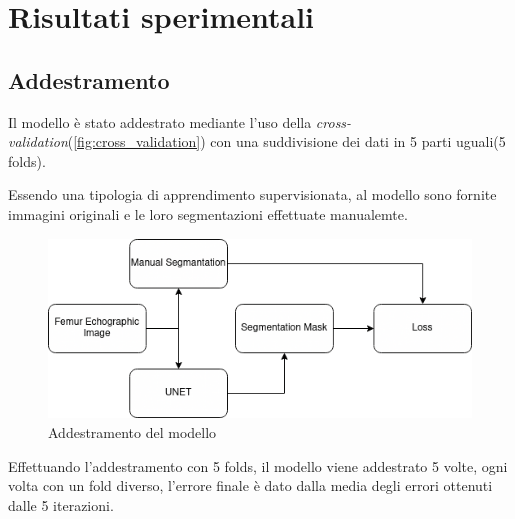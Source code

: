 \chapter{Risultati sperimentali} %
\label{chap:Risultati sperimentali}

\section{Addestramento} %
\label{sec:Addestramento}

Il modello \`e stato addestrato mediante l'uso della \textit{cross-validation}(\autoref{fig:cross_validation})
con una suddivisione dei dati in 5 parti uguali(5 folds).

Essendo una tipologia di apprendimento supervisionata, al modello sono fornite immagini
originali e le loro segmentazioni effettuate manualemte.

\begin{figure}[!ht]
	\begin{adjustbox}{width=0.7\columnwidth, center}
    \includegraphics{./images/training.png}
  \end{adjustbox}
  \caption{Addestramento del modello}
  \label{fig:addestramento del modello}
\end{figure}

Effettuando l'addestramento con 5 folds, il modello viene addestrato 5 volte, ogni volta con un fold diverso,
l'errore finale \`e dato dalla media degli errori ottenuti dalle 5 iterazioni.

